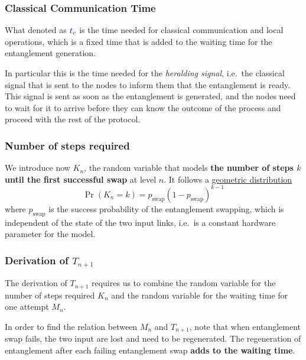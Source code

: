 \documentclass{masterthesis}
\begin{document}

\subsubsection*{Classical Communication Time}

What denoted as $\textcolor{blue}{t_c}$ is the time needed for classical communication and local operations, which is a fixed time that is added to the waiting time for the entanglement generation.

In particular this is the time needed for the \textit{heralding signal}, i.e.\ the classical signal that is sent to the nodes to inform them that the entanglement is ready. This signal is sent as soon as the entanglement is generated, and the nodes need to wait for it to arrive before they can know the outcome of the process and proceed with the rest of the protocol.

\subsubsection*{Number of steps required}

We introduce now $K_n$, the random variable that models \textbf{the number of steps $k$ until the first successful swap} at level $n$. It follows a \hyperref[subsection:geometric_pdf]{geometric distribution}
\begin{equation}\label{eq:pdf_swap_steps}
    \Pr(K_n = k) = p_\text{swap} {(1 - p_\text{swap})}^{k-1}
\end{equation}
where $p_\text{swap}$ is the success probability of the entanglement swapping, which is independent of the state of the two input links, i.e.\ is a constant hardware parameter for the model.

\subsubsection*{Derivation of $T_{n+1}$}
The derivation of $T_{n+1}$ requires us to combine the random variable for the number of steps required $K_n$ and the random variable for the waiting time for one attempt $M_n$.

In order to find the relation between $M_n$ and $T_{n+1}$, note that when entanglement swap fails, the two input are lost and need to be
regenerated. The regeneration of entanglement after each failing entanglement swap \textbf{adds to the waiting time}. 
\end{document}

